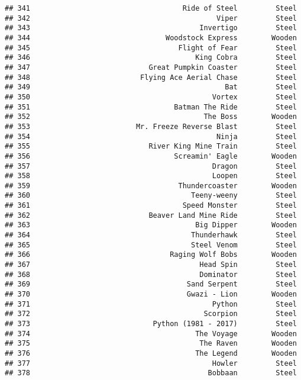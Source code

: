 \documentclass[
]{article}
\begin{document}
\begin{verbatim}
## 341                                    Ride of Steel         Steel
## 342                                            Viper         Steel
## 343                                        Invertigo         Steel
## 344                                Woodstock Express        Wooden
## 345                                   Flight of Fear         Steel
## 346                                       King Cobra         Steel
## 347                            Great Pumpkin Coaster         Steel
## 348                          Flying Ace Aerial Chase         Steel
## 349                                              Bat         Steel
## 350                                           Vortex         Steel
## 351                                  Batman The Ride         Steel
## 352                                         The Boss        Wooden
## 353                         Mr. Freeze Reverse Blast         Steel
## 354                                            Ninja         Steel
## 355                            River King Mine Train         Steel
## 356                                  Screamin' Eagle        Wooden
## 357                                           Dragon         Steel
## 358                                           Loopen         Steel
## 359                                   Thundercoaster        Wooden
## 360                                      Teeny-weeny         Steel
## 361                                    Speed Monster         Steel
## 362                            Beaver Land Mine Ride         Steel
## 363                                       Big Dipper        Wooden
## 364                                      Thunderhawk         Steel
## 365                                      Steel Venom         Steel
## 366                                 Raging Wolf Bobs        Wooden
## 367                                        Head Spin         Steel
## 368                                        Dominator         Steel
## 369                                     Sand Serpent         Steel
## 370                                     Gwazi - Lion        Wooden
## 371                                           Python         Steel
## 372                                         Scorpion         Steel
## 373                             Python (1981 - 2017)         Steel
## 374                                       The Voyage        Wooden
## 375                                        The Raven        Wooden
## 376                                       The Legend        Wooden
## 377                                           Howler         Steel
## 378                                          Bobbaan         Steel

\end{verbatim}
\end{document}
